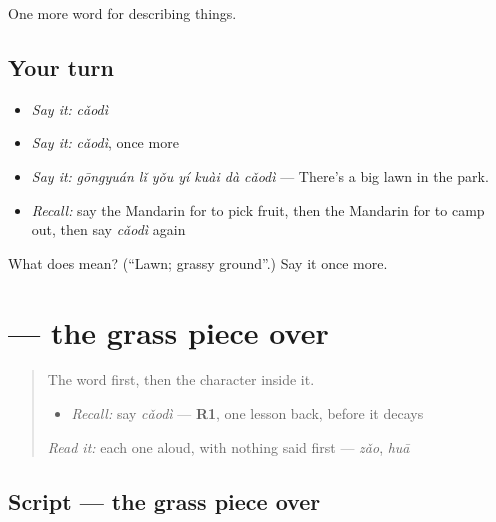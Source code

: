 \begin{grammarlens}[title={What you've built}]
One more word for describing things.
\end{grammarlens}

\subsection*{Your turn}
\begin{itemize}
\raggedright
  \item \emph{Say it:} \emph{cǎodì}
  \item \emph{Say it:} \emph{cǎodì}, once more
  \item \emph{Say it:} \emph{gōngyuán lǐ yǒu yí kuài dà cǎodì} — There's a big lawn in the park.
  \item \emph{Recall:} say the Mandarin for to pick fruit, then the Mandarin for to camp out, then say \emph{cǎodì} again
\end{itemize}

\begin{tcolorbox}[breakable,colback=teal!4,colframe=teal!35!black,title={Before you move on}]
What does  mean? (\textquotedblleft{}Lawn; grassy ground\textquotedblright{}.) Say it once more.
\end{tcolorbox}
\section[\texorpdfstring{\zh{草} (cǎo)}{草 (cǎo)}]{ — the grass piece over }

\label{lesson:ZH-W226-cao-grass}



\begin{quote}
The word first, then the character inside it.

\begin{itemize}
\raggedright
  \item \emph{Recall:} say \emph{cǎodì} — \textbf{R1}, one lesson back, before it decays
\end{itemize}

\begin{quote}
 
\end{quote}

\emph{Read it:} each one aloud, with nothing said first — \emph{zǎo}, \emph{huā}
\end{quote}

\subsection*{Script — the grass piece over }

